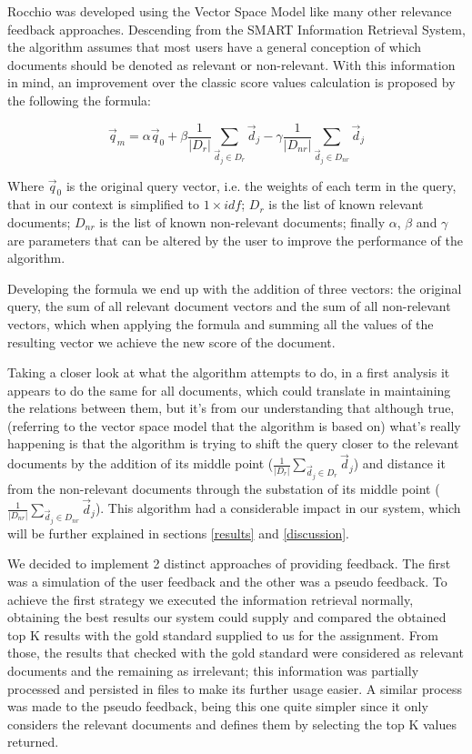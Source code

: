 \documentclass[12pt]{article}
\begin{document}
Rocchio was developed using the Vector Space Model like many other relevance 
feedback approaches. 
Descending from the SMART Information Retrieval System, the algorithm assumes 
that most users have a general conception of which documents should be denoted 
as relevant or non-relevant. 
With this information in mind, an improvement over the classic score values 
calculation is proposed by the following the formula:

\vspace{-10pt}
\begin{equation}
  \vec{q}_{m} = \alpha\vec{q}_{0} + \beta\frac{1}{|D_{r}|} \sum_{ \vec{d}_{j} \in D_{r}} \vec{d}_{j} - \gamma\frac{1}{|D_{nr}|} \sum_{ \vec{d}_{j} \in D_{nr}} \vec{d}_{j}
\end{equation}
 
Where $\vec{q}_{0}$ is the original query vector, i.e. the weights of each term 
in the query, that in our context is simplified to $1 \times idf$; 
$D_{r}$ is the list of known relevant documents;
$D_{nr}$ is the list of known non-relevant documents; 
finally $\alpha$, $\beta$ and $\gamma$ are parameters that can be altered by the 
user to improve the performance of the algorithm. 

Developing the formula we end up with the addition of three vectors: 
the original query, the sum of all relevant document vectors and the sum of all 
non-relevant vectors, which when applying the formula and summing all the values 
of the resulting vector we achieve the new score of the document.

Taking a closer look at what the algorithm attempts to do, in a first analysis 
it appears to do the same for all documents, which could translate in maintaining 
the relations between them, but it's from our understanding that although true, 
(referring to the vector space model that the algorithm is based on) what's 
really happening is that the algorithm is trying to shift the query closer to 
the relevant documents by the addition of its middle point 
($\frac{1}{|D_{r}|} \sum_{ \vec{d}_{j} \in D_{r}} \vec{d}_{j}$) and distance it 
from the non-relevant documents through the substation of its middle point 
($\frac{1}{|D_{nr}|} \sum_{ \vec{d}_{j} \in D_{nr}} \vec{d}_{j}$).
This algorithm had a considerable impact in our system, which will be further 
explained in sections \ref{results} and \ref{discussion}.

We decided to implement 2 distinct approaches of providing feedback.
The first was a simulation of the user feedback and the other was a pseudo feedback. 
To achieve the first strategy we executed the information retrieval normally, 
obtaining the best results our system could supply and compared the obtained 
top K results with the gold standard supplied to us for the assignment. 
From those, the results that checked with the gold standard were considered as 
relevant documents and the remaining as irrelevant; 
this information was partially processed and persisted in files to make its 
further usage easier. 
A similar process was made to the pseudo feedback, being this one quite simpler 
since it only considers the relevant documents and defines them by selecting the 
top K values returned.
\end{document}
